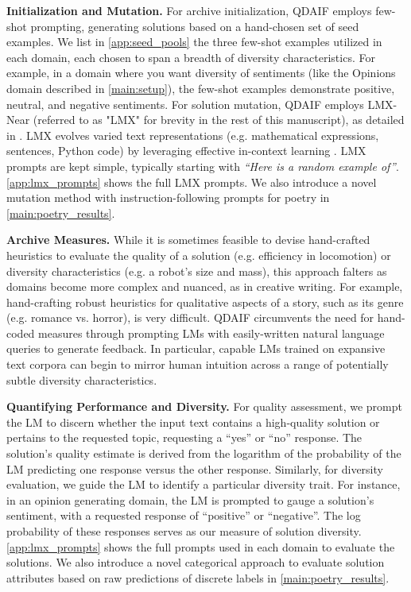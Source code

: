 \textbf{Initialization and Mutation.}
For archive initialization, QDAIF employs few-shot prompting, generating solutions based on a hand-chosen set of seed examples. We list in \cref{app:seed_pools} the three few-shot examples utilized in each domain, each chosen to span a breadth of diversity characteristics. For example, in a domain where you want diversity of sentiments (like the Opinions domain described in \cref{main:setup}), the few-shot examples demonstrate positive, neutral, and negative sentiments. For solution mutation, QDAIF employs LMX-Near (referred to as "LMX" for brevity in the rest of this manuscript), as detailed in \citet{meyerson2023language}. LMX evolves varied text representations (e.g. mathematical expressions, sentences, Python code) by leveraging effective in-context learning \citep{brown2020language}. LMX prompts are kept simple, typically starting with {\it ``Here is a random example of''}. \cref{app:lmx_prompts} shows the full LMX prompts. We also introduce a novel mutation method with instruction-following prompts for poetry in \cref{main:poetry_results}.

\textbf{Archive Measures.}
While it is sometimes feasible to devise hand-crafted heuristics to evaluate the quality of a solution (e.g. efficiency in locomotion) or diversity characteristics (e.g. a robot's size and mass), this approach falters as domains become more complex and nuanced, as in creative writing. For example, hand-crafting robust heuristics for qualitative aspects of a story, such as its genre (e.g. romance vs. horror), is very difficult. QDAIF circumvents the need for hand-coded measures through prompting LMs with easily-written natural language queries to generate feedback. In particular, capable LMs trained on expansive text corpora can begin to mirror human intuition across a range of potentially subtle diversity characteristics. 

\textbf{Quantifying Performance and Diversity.}
For quality assessment, we prompt the LM to discern whether the input text contains a high-quality solution or pertains to the requested topic, requesting a ``yes'' or ``no'' response. The solution's quality estimate is derived from the logarithm of the probability of the LM predicting one response versus the other response. Similarly, for diversity evaluation, we guide the LM to identify a particular diversity trait. For instance, in an opinion generating domain, the LM is prompted to gauge a solution's sentiment, with a requested response of ``positive'' or ``negative''. The log probability of these responses serves as our measure of solution diversity. \cref{app:lmx_prompts} shows the full prompts used in each domain to evaluate the solutions. We also introduce a novel categorical approach to evaluate solution attributes based on raw predictions of discrete labels in \cref{main:poetry_results}.

